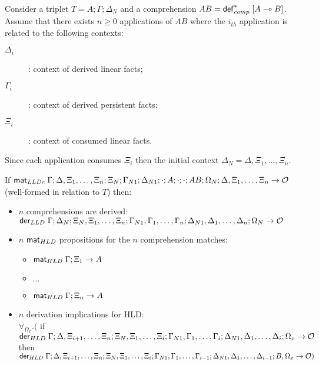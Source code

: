 \begin{lemma}\label{thm:comprehension}
Consider a triplet $T = A; \Gamma; \Delta_{N}$ and a comprehension $AB =
\mathsf{def}_{comp}^{*} \; [A \multimap B]$. Assume that there exists $n \geq 0$ applications of $AB$
where the $i_{th}$ application is related to the following contexts:
\begin{description}
   \item[$\Delta_i$]: context of derived linear facts;
   \item[$\Gamma_i$]: context of derived persistent facts;
   \item[$\Xi_i$]: context of consumed linear facts.
\end{description}

Since each application consumes $\Xi_i$ then the initial context $\Delta_N =
\Delta, \Xi_1, \dotsc, \Xi_n$.

If $\mathsf{mat}_{LLDc} \; \Gamma; \Delta, \Xi_1, \dotsc, \Xi_n;
\Xi_N; \Gamma_{N1}; \Delta_{N1}; \cdot; A; \cdot; \cdot; AB; \Omega_N;
\Delta, \Xi_1, \dotsc, \Xi_n \rightarrow \mathcal{O}$ (well-formed in
relation to $T$) then:

\begin{itemize}[leftmargin=*]
   \item $n$ comprehensions are derived:\\
   $\mathsf{der}_{LLD} \; \Gamma; \Delta_N; \Xi_N, \Xi_1, \dotsc, \Xi_n; \Gamma_{N1},
   \Gamma_1, \dotsc, \Gamma_n; \Delta_{N1}, \Delta_1, \dotsc, \Delta_n; \Omega_N \rightarrow \mathcal{O}$
   \item $n$ $\mathsf{mat}_{HLD} \;$propositions for the $n$ comprehension matches:
   \begin{itemize}[leftmargin=\secondm]
      \item $\mathsf{mat}_{HLD} \; \Gamma; \Xi_1 \rightarrow A$
      \item $\dots$
      \item $\mathsf{mat}_{HLD} \; \Gamma; \Xi_n \rightarrow A$
   \end{itemize}
   \item $n$ derivation implications for HLD: \\
   $\forall_{\Omega_x}.($ if $\mathsf{der}_{HLD} \; \Gamma; \Delta, \Xi_{i+1}, \dotsc, \Xi_n; \Xi_N, \Xi_1,
         \dotsc, \Xi_i; \Gamma_{N1}, \Gamma_1, \dotsc, \Gamma_i; \Delta_{N1},
         \Delta_1, \dotsc, \Delta_i; \Omega_x \rightarrow \mathcal{O}$ then $\mathsf{der}_{HLD} \; \Gamma; \Delta, \Xi_{i+1}, \dotsc, \Xi_n; \Xi_N, \Xi_1,
         \dotsc,
         \Xi_i; \Gamma_{N1}, \Gamma_1, \dotsc, \Gamma_{i-1}; \Delta_{N1},
         \Delta_1, \dotsc, \Delta_{i-1}; B, \Omega_x \rightarrow \mathcal{O})$
\end{itemize}
\end{lemma}


